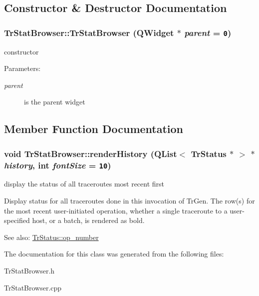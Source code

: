 \subsection{Constructor \& Destructor Documentation}
\hypertarget{classTrStatBrowser_e7430d311eb6ee13d5e4d75a4f21d29b}{
\subsubsection[TrStatBrowser]{\setlength{\rightskip}{0pt plus 5cm}TrStatBrowser::TrStatBrowser (QWidget $\ast$ {\em parent} = {\tt 0})}}
\label{classTrStatBrowser_e7430d311eb6ee13d5e4d75a4f21d29b}


constructor \begin{Desc}
\item[Parameters:]
\begin{description}
\item[{\em parent}]is the parent widget \end{description}
\end{Desc}


\subsection{Member Function Documentation}
\hypertarget{classTrStatBrowser_55228e4f43413c06cd97a8d1fb36f074}{
\subsubsection[renderHistory]{\setlength{\rightskip}{0pt plus 5cm}void TrStatBrowser::renderHistory (QList$<$ {\bf TrStatus} $\ast$ $>$ $\ast$ {\em history}, \/  int {\em fontSize} = {\tt 10})}}
\label{classTrStatBrowser_55228e4f43413c06cd97a8d1fb36f074}


display the status of all traceroutes most recent first 

Display status for all traceroutes done in this invocation of TrGen. The row(s) for the most recent user-initiated operation, whether a single traceroute to a user-specified host, or a batch, is rendered as bold. \begin{Desc}
\item[See also:]\hyperlink{classTrStatus_67f6a623c53b7352ade73e79b41775dd}{TrStatus::op\_\-number} \end{Desc}


The documentation for this class was generated from the following files:\begin{CompactItemize}
\item 
TrStatBrowser.h\item 
TrStatBrowser.cpp\end{CompactItemize}
